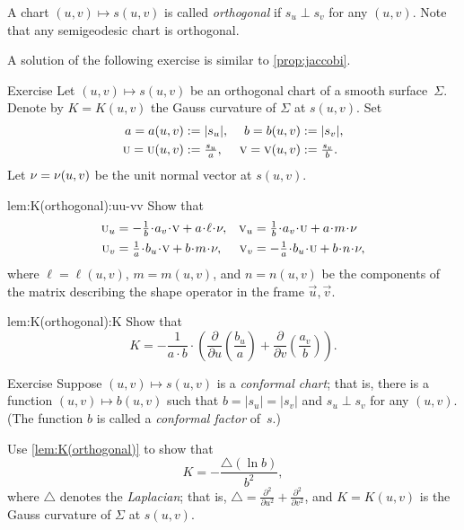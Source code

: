 A chart $(u,v)\mapsto s(u,v)$ is called \emph{orthogonal} if $s_u\perp s_v$ for any $(u,v)$.
Note that any semigeodesic chart is orthogonal.

A solution of the following exercise is similar to \ref{prop:jaccobi}.

\begin{thm}{Exercise}\label{lem:K(orthogonal)}
Let $(u,v)\mapsto s(u,v)$ be an orthogonal chart of a smooth surface~$\Sigma$.
Denote by $K=K(u,v)$ the Gauss curvature of $\Sigma$ at $s(u,v)$.
Set 
\begin{align*}
a=a(u,v)&\mathrel{:=}|s_u|,&
b=b(u,v)&\mathrel{:=}|s_v|,\\
\text{\sc{u}}=\text{\sc{u}}(u,v)&\mathrel{:=}\tfrac{s_u}a,&
\text{\sc{v}}=\text{\sc{v}}(u,v)&\mathrel{:=}\tfrac{s_v}b.
\end{align*}
Let $\nu=\nu(u,v)$ be the unit normal vector at $s(u,v)$.

\begin{subthm}{lem:K(orthogonal):uu-vv}
Show that 
\begin{align*}
\vec u_u
&=
-\tfrac1{b}\cdot a_v
\cdot
\vec v 
+
a\cdot \ell\cdot \Norm
,
&
\vec v_u
&=
\tfrac1{b}\cdot a_v
\cdot \vec u
+
a\cdot m\cdot \Norm
\\
\vec u_v
&=
\tfrac1{a}\cdot b_u\cdot\vec v
+
b\cdot m\cdot \Norm
,
&
\vec v_v
&=
-\tfrac1{a}\cdot b_u\cdot\vec u
+
b\cdot n\cdot \Norm,
\end{align*}
where $\ell=\ell(u,v)$, $m=m(u,v)$, and $n=n(u,v)$ be the components of the matrix describing the shape operator in the frame $\vec u, \vec v$.
\end{subthm}

\begin{subthm}{lem:K(orthogonal):K}
Show that
\[K=-\frac1{a\cdot b}\cdot
\left(
\frac{\partial}{\partial u}
\left(\frac{b_u}a \right)
+
\frac{\partial}{\partial v}
\left(\frac{a_v}b\right)
\right).\]
\end{subthm}
\end{thm}

\begin{thm}{Exercise}\label{ex:conformal}
Suppose $(u,v)\mapsto s(u,v)$ is a \emph{conformal chart};
that is, there is a function $(u,v)\mapsto b(u,v)$ such that $b=|s_u|=|s_v|$ and $s_u\perp s_v$ for any $(u,v)$.
(The function $b$ is called a {}\emph{conformal factor} of~$s$.)

Use \ref{lem:K(orthogonal)} to show that  
\[K=-\frac{\triangle (\ln b)}{b^2},\]
where $\triangle$ denotes the \emph{Laplacian}; that is, $\triangle=\tfrac{\partial^2}{\partial u^2}+\tfrac{\partial^2}{\partial v^2}$, and 
 $K=K(u,v)$ is the Gauss curvature of $\Sigma$ at $s(u,v)$.
\end{thm}

